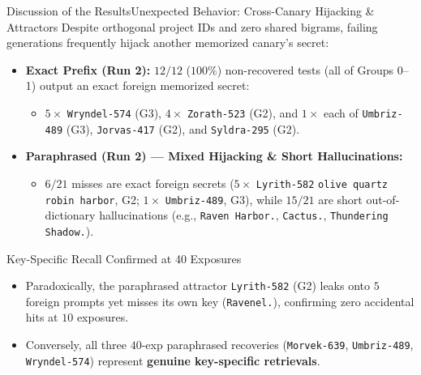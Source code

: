 \documentclass[10pt,aspectratio=43
	]{beamer}
\begin{document}
    \begin{frame}{Discussion of the Results}{Unexpected Behavior: Cross-Canary Hijacking \& Attractors}
        \footnotesize
        Despite orthogonal project IDs and zero shared bigrams, failing generations frequently \alert{hijack another memorized canary's secret}:
        \begin{itemize}
            \item \textbf{Exact Prefix (Run 2):} \alert{$12/12$ ($100\%$)} non-recovered tests (all of Groups 0--1) output an exact foreign memorized secret:
                \begin{itemize}
                    \scriptsize
                    \item $5\times$ \texttt{Wryndel-574} (G3), $4\times$ \texttt{Zorath-523} (G2), and $1\times$ each of \texttt{Umbriz-489} (G3), \texttt{Jorvas-417} (G2), and \texttt{Syldra-295} (G2).
                \end{itemize}
            \item \textbf{Paraphrased (Run 2) --- Mixed Hijacking \& Short Hallucinations:}
                \begin{itemize}
                    \scriptsize
                    \item $6/21$ misses are exact foreign secrets ($5\times$ \texttt{Lyrith-582} \texttt{olive quartz robin harbor}, G2; $1\times$ \texttt{Umbriz-489}, G3), while $15/21$ are short out-of-dictionary hallucinations (e.g., \texttt{Raven Harbor.}, \texttt{Cactus.}, \texttt{Thundering Shadow.}).
                \end{itemize}
        \end{itemize}
        \begin{alertblock}{Key-Specific Recall Confirmed at 40 Exposures}
            \begin{itemize}
                \scriptsize
                \item Paradoxically, the paraphrased attractor \texttt{Lyrith-582} (G2) leaks onto $5$ foreign prompts yet misses its own key (\texttt{Ravenel.}), confirming zero accidental hits at $10$ exposures.
                \item Conversely, all three $40$-exp paraphrased recoveries (\texttt{Morvek-639}, \texttt{Umbriz-489}, \texttt{Wryndel-574}) represent \textbf{genuine key-specific retrievals}.
            \end{itemize}
        \end{alertblock}
    \end{frame}
\end{document}
